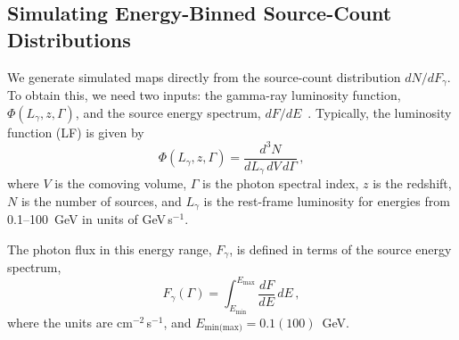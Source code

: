 \subsection{Simulating Energy-Binned Source-Count Distributions}
\label{sims}

We generate simulated maps directly from the source-count distribution $dN/dF_{\gamma}$. To obtain this, we need two inputs: the gamma-ray luminosity function, $\Phi(L_{\gamma},z,\Gamma)$, and the source energy spectrum, $dF/dE$~\cite{DiMauro:2014wha}.  Typically, the luminosity function (LF) is given by
\begin{equation}
\Phi(L_{\gamma},z,\Gamma)=\frac{d^3N}{dL_\gamma\,dV\,d\Gamma} \,  ,
\end{equation}
where $V$ is the comoving volume, $\Gamma$ is the photon spectral index, $z$ is the redshift, $N$ is the number of sources, and $L_\gamma$ is the rest-frame luminosity for energies from 0.1--100~GeV in units of GeV\,s$^{-1}$.     

The photon flux in this energy range, $F_\gamma$, 
is defined in terms of the source energy spectrum,
\begin{equation}
F_\gamma(\Gamma) = \int_{E_\text{min}}^{E_\text{max}}\frac{dF}{dE} \, dE \, ,
\label{eq: Fgamma}
\end{equation}
where the units are cm$^{-2}$\,s$^{-1}$, and $E_\text{min(max)} = 0.1(100)$~GeV.

